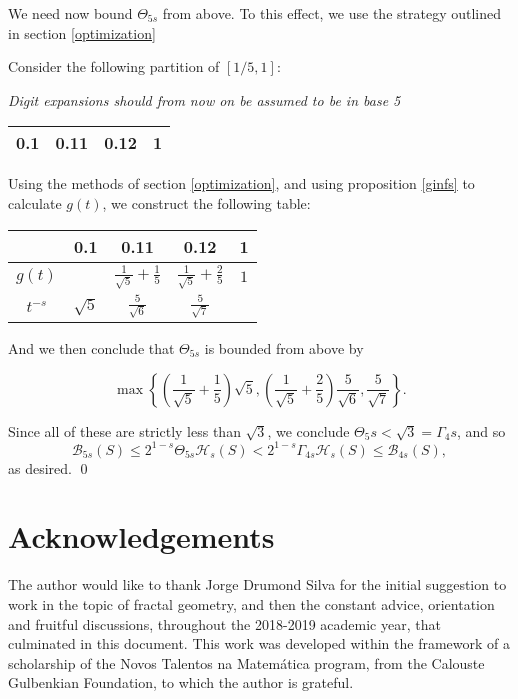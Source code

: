 \documentclass[11pt, reqno]{amsart}
\newcommand{\HH}{\mathcal{H}}
\newcommand{\BB}{\mathcal{B}}
\begin{document}
We need now bound $\Theta_{5s}$ from above. To this effect, we use the strategy outlined in section \ref{optimization}

Consider the following partition of $\left[1/5, 1 \right]$:

\emph{Digit expansions should from now on be assumed to be in base 5}

\begin{center}
\begin{tabular}{| c | @{\qquad\qquad} | c | @{\qquad\qquad} | c | @{\qquad\qquad} | c |}
\hline
0.1 & 0.11 & 0.12 & 1 \\
\hline
\end{tabular}
\end{center}

Using the methods of section \ref{optimization}, and using proposition \ref{ginfs} to calculate $g(t)$, we construct the following table:

\begin{center}
\tabulinesep=1.2mm
\begin{tabu}{| c | | c | @{\qquad\qquad} | c | @{\qquad\qquad} | c | @{\qquad\qquad} | c |}
\hline
& 0.1 & 0.11 & 0.12 & 1 \\
\hline
$g(t)$ & & $\frac 1 {\sqrt{5}} + \frac 1 5$ & $\frac 1 {\sqrt{5}} + \frac 2 5$ & $1$ \\
$t^{-s}$ & $\sqrt 5$ & $\frac 5 {\sqrt 6}$ & $\frac 5 {\sqrt 7}$ & \\
\hline
\end{tabu}
\end{center}

And we then conclude that $\Theta_{5s}$ is bounded from above by

\[ \max \left\{ \left(\frac 1 {\sqrt{5}} + \frac 1 5\right) \sqrt 5, \left(\frac 1 {\sqrt{5}} + \frac 2 5\right) \frac 5 {\sqrt 6}, \frac 5 {\sqrt 7} \right\}.\]

Since all of these are strictly less than $\sqrt 3$, we conclude $\Theta_5s < \sqrt3 = \Gamma_4s$, and so
\[\BB_{5s}(S) \leq 2^{1-s} \Theta_{5s} \HH_s(S) < 2^{1-s} \Gamma_{4s} \HH_s(S) \leq \BB_{4s}(S),\]
as desired. \qed

\section{Acknowledgements}

The author would like to thank Jorge Drumond Silva for the initial suggestion to work in the topic of fractal geometry, and then the constant advice, orientation and fruitful discussions, throughout the 2018-2019 academic year, that culminated in this document. This work was developed within the framework of a scholarship of the Novos Talentos na Matemática program, from the Calouste Gulbenkian Foundation, to which the author is grateful. 
\end{document}
